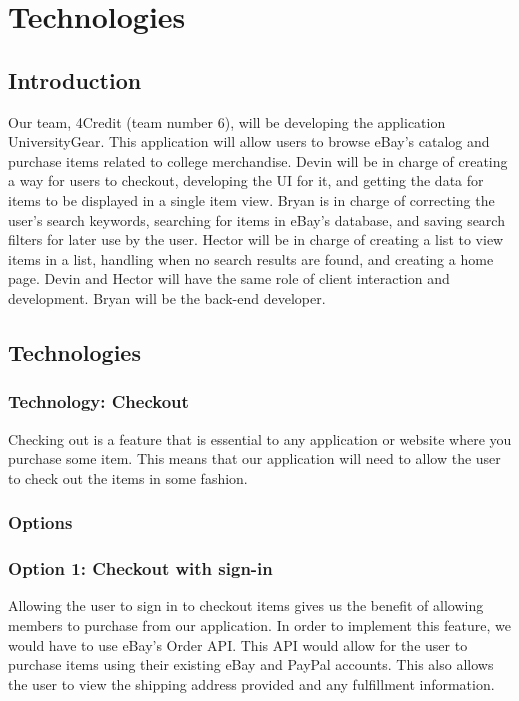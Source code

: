 \documentclass[journal,compsoc, 10pt, draftclsnofoot, onecolumn]{IEEEtran}
\begin{document}
\section{Technologies}
\subsection{Introduction}
Our team, 4Credit (team number 6), will be developing the application UniversityGear. 
This application will allow users to browse eBay's catalog and purchase items 
related to college merchandise. Devin will be in charge of creating a way for 
users to checkout, developing the UI for it, and getting the data for items to
be displayed in a single item view. Bryan is in charge of correcting the user's 
search keywords, searching for items in eBay's database, and saving search 
filters for later use by the user. Hector will be in charge of creating a list to 
view items in a list, handling when no search results are found, and creating
a home page. Devin and Hector will have the same role of client interaction and
development. Bryan will be the back-end developer.

\subsection{Technologies}
\subsubsection{Technology: Checkout}
Checking out is a feature that is essential to any application or website where
you purchase some item. This means that our application will need to allow the
user to check out the items in some fashion.

\subsubsection*{Options}
\subsubsection*{Option 1: Checkout with sign-in}
Allowing the user to sign in to checkout items gives us the benefit of allowing
members to purchase from our application. In order to implement this feature, we 
would have to use eBay's Order API. This API would allow for the user to
purchase items using their existing eBay and PayPal accounts. This also allows
the user to view the shipping address provided and any fulfillment information.
\end{document}

